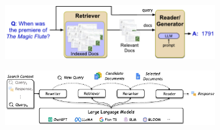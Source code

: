 \begin{figure}[H]
    \centering
    \begin{subfigure}{0.75\linewidth}
        \centering
        \includegraphics[width=\linewidth]{./img/_qa_rag1.pdf}
    \end{subfigure}
    \begin{subfigure}{0.9\linewidth}
        \centering
        \includegraphics[width=\linewidth]{./img/_qa_rag2.pdf}
    \end{subfigure}
\end{figure}